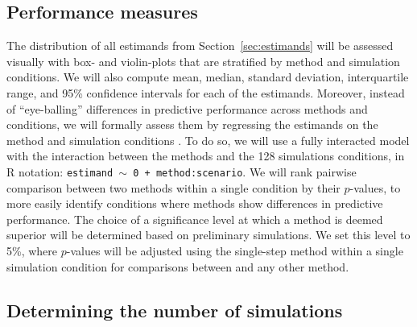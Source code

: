\subsection{Performance measures} \label{sec:performance}

The distribution of all estimands from Section~\ref{sec:estimands} will be
assessed visually with box- and violin-plots that are stratified by method and
simulation conditions. We will also compute mean, median, standard deviation,
interquartile range, and 95\% confidence intervals
for each of the estimands. Moreover, instead of ``eye-balling'' differences in predictive
performance across methods and conditions, we will formally assess them by regressing
the estimands on the method and simulation conditions \citep[\cf][]{Skrondal2000}.
To do so, we will use
a fully interacted model with the interaction between the methods and the
128 simulations conditions, \ie in R notation:
\texttt{estimand $\sim$ 0 + method:scenario}. %
We will rank pairwise comparison between two methods within a single condition
by their $p$-values, to more easily identify conditions where methods
show differences in predictive performance. The choice of a significance level
at which a method is deemed superior will be determined based on preliminary
simulations. We set this level to 5\%, where $p$-values will be adjusted using
the single-step method \citep{pkg:multcomp} within a single simulation condition
for comparisons between \ainet{} and any other method.


\subsection{Determining the number of simulations}


